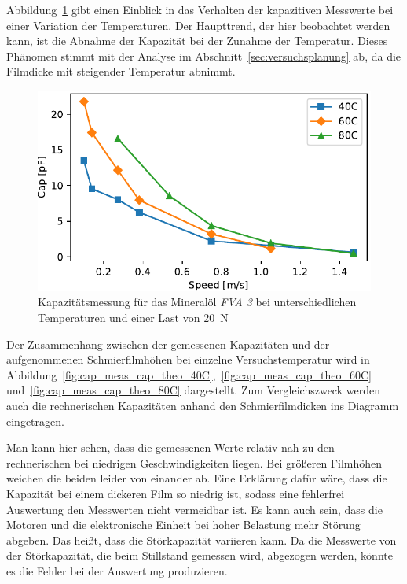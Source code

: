 Abbildung~\ref{fig:cap_vs_speed_dif_temp_meas} gibt einen Einblick in das Verhalten der kapazitiven Messwerte bei einer Variation der Temperaturen.
Der Haupttrend, der hier beobachtet werden kann, ist die Abnahme der Kapazität bei der Zunahme der Temperatur.
Dieses Phänomen stimmt mit der Analyse im Abschnitt~\ref{sec:versuchsplanung} ab, da die Filmdicke mit steigender Temperatur abnimmt.

\begin{figure}[htb]
    \centering
    \includegraphics[]{./images/cap_vs_speed_dif_temp_meas.pdf}
    \caption{Kapazitätsmessung für das Mineralöl \textit{FVA 3} bei unterschiedlichen Temperaturen und einer Last von \SI{20}{\N}}
    \label{fig:cap_vs_speed_dif_temp_meas}
\end{figure}

Der Zusammenhang zwischen der gemessenen Kapazitäten und der aufgenommenen Schmierfilmhöhen bei einzelne Versuchstemperatur wird in Abbildung~\ref{fig:cap_meas_cap_theo_40C},~\ref{fig:cap_meas_cap_theo_60C} und~\ref{fig:cap_meas_cap_theo_80C} dargestellt.
Zum Vergleichszweck werden auch die rechnerischen Kapazitäten anhand den Schmierfilmdicken ins Diagramm eingetragen.

Man kann hier sehen, dass die gemessenen Werte relativ nah zu den rechnerischen bei niedrigen Geschwindigkeiten liegen.
Bei größeren Filmhöhen weichen die beiden leider von einander ab.
Eine Erklärung dafür wäre, dass die Kapazität bei einem dickeren Film so niedrig ist, sodass eine fehlerfrei Auswertung den Messwerten nicht vermeidbar ist.
Es kann auch sein, dass die Motoren und die elektronische Einheit bei hoher Belastung mehr Störung abgeben.
Das heißt, dass die Störkapazität variieren kann.
Da die Messwerte von der Störkapazität, die beim Stillstand gemessen wird, abgezogen werden, könnte es die Fehler bei der Auswertung produzieren.

